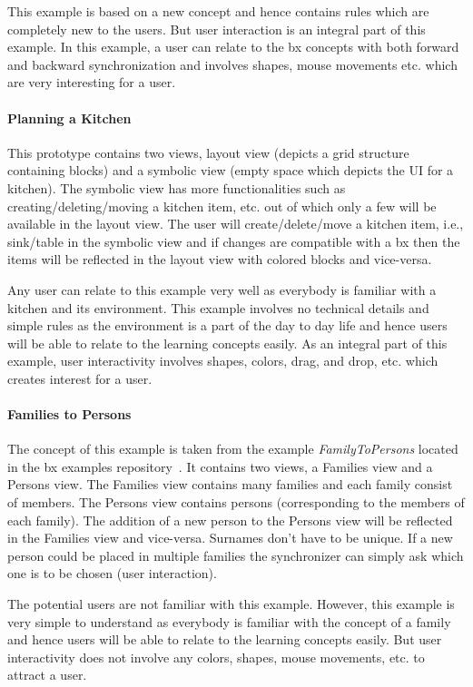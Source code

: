 This example is based on a new concept and hence contains rules which are completely new to the users. But user interaction is an integral part of this example. In this example, a user can relate to the bx concepts with both forward and backward synchronization and involves shapes, mouse movements etc. which are very interesting for a user.

\paragraph{Planning a Kitchen}
This prototype contains two views, layout view (depicts a grid structure containing blocks) and a symbolic view (empty space which depicts the UI for a kitchen). The symbolic view has more functionalities such as creating/deleting/moving a kitchen item, etc. out of which only a few will be available in the layout view. The user will create/delete/move a kitchen item, i.e., sink/table in the symbolic view and if changes are compatible with a bx then the items will be reflected in the layout view with colored blocks and vice-versa.

Any user can relate to this example very well as everybody is familiar with a kitchen and its environment. This example involves no technical details and simple rules as the environment is a part of the day to day life and hence users will be able to relate to the learning concepts easily. As an integral part of this example, user interactivity involves shapes, colors, drag, and drop, etc. which creates interest for a user.

\paragraph{Families to Persons}
The concept of this example is taken from the example \emph{FamilyToPersons} located in the bx examples repository~\cite{bx-examples}. It contains two views, a Families view and a Persons view. The Families view contains many families and each family consist of members. The Persons view contains persons (corresponding to the members of each family). The addition of a new person to the Persons view will be reflected in the Families view and vice-versa. Surnames don't have to be unique. If a new person could be placed in multiple families the synchronizer can simply ask which one is to be chosen (user interaction).

The potential users are not familiar with this example. However, this example is very simple to understand as everybody is familiar with the concept of a family and hence users will be able to relate to the learning concepts easily. But user interactivity does not involve any colors, shapes, mouse movements, etc. to attract a user.

